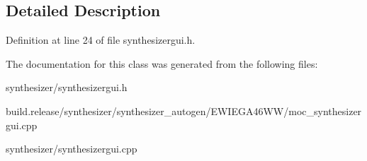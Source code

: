 \subsection{Detailed Description}


Definition at line 24 of file synthesizergui.\+h.



The documentation for this class was generated from the following files\+:\begin{DoxyCompactItemize}
\item 
synthesizer/synthesizergui.\+h\item 
build.\+release/synthesizer/synthesizer\+\_\+autogen/\+E\+W\+I\+E\+G\+A46\+W\+W/moc\+\_\+synthesizergui.\+cpp\item 
synthesizer/synthesizergui.\+cpp\end{DoxyCompactItemize}
